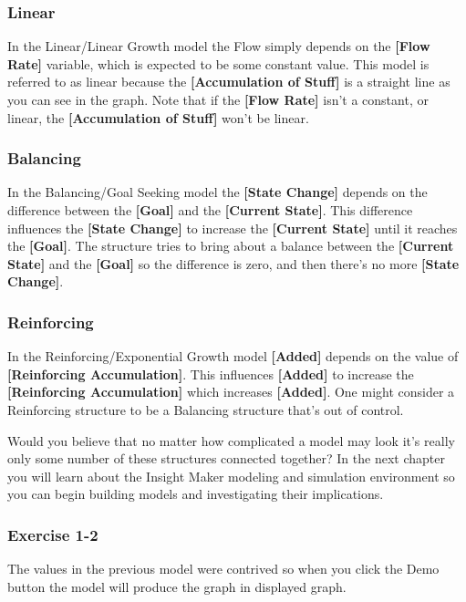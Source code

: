 \documentclass[]{memoir}
\newcommand{\p}[1]{\textbf{{[}#1{]}}}
\begin{document}
\subsubsection{Linear}

In the Linear/Linear Growth model the Flow simply depends on the
\p{Flow Rate} variable, which is expected to be some constant value.
This model is referred to as linear because the
\p{Accumulation of Stuff} is a straight line as you can see in the
graph. Note that if the \p{Flow Rate} isn't a constant, or linear, the
\p{Accumulation of Stuff} won't be linear.

\subsubsection{Balancing}

In the Balancing/Goal Seeking model the \p{State Change} depends on the
difference between the \p{Goal} and the \p{Current State}. This
difference influences the \p{State Change} to increase the
\p{Current State} until it reaches the \p{Goal}. The structure tries to
bring about a balance between the \p{Current State} and the \p{Goal} so
the difference is zero, and then there's no more \p{State Change}.

\subsubsection{Reinforcing}

In the Reinforcing/Exponential Growth model \p{Added} depends on the
value of \p{Reinforcing Accumulation}. This influences \p{Added} to
increase the \p{Reinforcing Accumulation} which increases \p{Added}. One
might consider a Reinforcing structure to be a Balancing structure
that's out of control.

Would you believe that no matter how complicated a model may look it's
really only some number of these structures connected together? In the
next chapter you will learn about the Insight Maker modeling and
simulation environment so you can begin building models and
investigating their implications.

\subsubsection{Exercise 1-2}

The values in the previous model were contrived so when you click the
Demo button the model will produce the graph in displayed graph.
\end{document}
